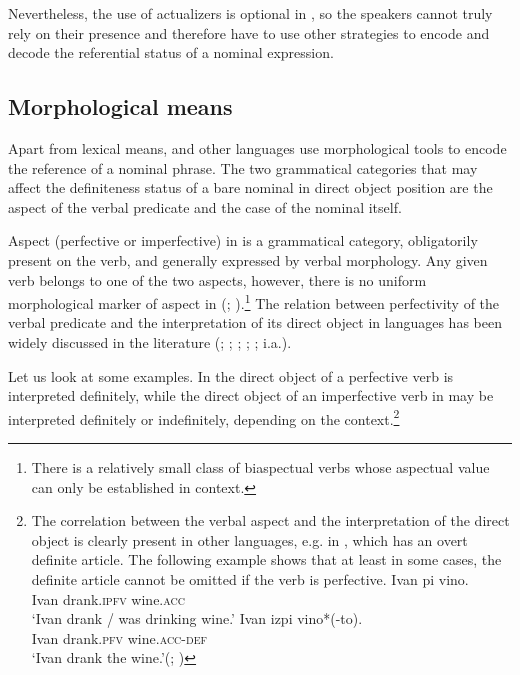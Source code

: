 \documentclass[output=paper,
colorlinks,
citecolor=brown,
newtxmath
]{langscibook}
\begin{document}
\noindent Nevertheless, the use of actualizers is optional in , so the speakers cannot truly rely on their presence and therefore have to use other strategies to encode and decode the referential status of a nominal expression. %

\subsection{%
Morphological means}
Apart from lexical means,  and other  languages use %
 morphological tools to encode the reference of a nominal phrase. The two grammatical categories that may affect the definiteness status of a bare nominal in direct object position are the aspect of the verbal predicate and the case of the nominal itself.

Aspect (perfective or imperfective) in  is a grammatical category, obligatorily present on the %
verb, and generally expressed by verbal morphology. Any given verb belongs to one of the two aspects, however, there is no uniform morphological marker of aspect in  (\citealt{Klein1995}; \citealt{Borik2006}).\footnote{There is a relatively small class of biaspectual verbs whose aspectual value can only be established in  context.} The relation between perfectivity of the verbal predicate and the interpretation of its direct object in  languages has been widely discussed in the literature (\citealt{Wierzbicka1967}; \citealt{Krifka1992}; \citealt{Schoorlemmer1995}; \citealt{Verkuyl1999}; \citealt{Filip1993}; i.a.).

Let us look at some examples. In  the direct object of a perfective verb is interpreted definitely, while the direct object of an imperfective verb in  may be interpreted definitely or indefinitely, depending on the context.\footnote{The correlation between the verbal aspect and the interpretation of the direct object is clearly present in other  languages, e.g. in , which has an overt definite article. The following example shows that at least in some cases, the definite article cannot be omitted if the verb is perfective.
\ea
\ea \label{ex:seres:ia}
\gll	Ivan 	pi 					vino.\\
		Ivan 	drank.\textsc{ipfv} 	wine.\textsc{acc}\\
\glt		`Ivan drank / was drinking wine.'
\ex \label{ex:seres:ib}
\gll Ivan 	izpi 				vino*(-to).\\
		Ivan 	drank.\textsc{pfv} 	wine.\textsc{acc}-\textsc{def}\\
\glt `Ivan drank the wine.'\hfill (; \citealt[944]{Dimitrova-Vulchanova2012})
\z \z
}
\end{document}
